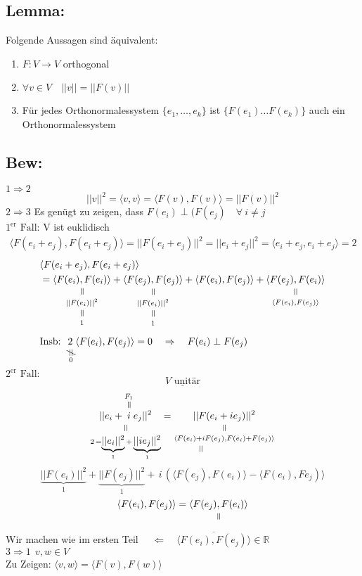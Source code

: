 \documentclass[titlepage,12pt,a4paper,ngerman]{report}
\newcommand{\verteq}{\rotatebox{90}{$\,=$}}
\newcommand{\equalto}[2]{\underset{\scriptstyle\overset{\mkern4mu\verteq}{#2}}{#1}}
\newcommand{\equaltoup}[2]{\overset{\scriptstyle\underset{\mkern4mu\verteq}{#2}}{#1}}
\newcommand{\custo}[3]{\underset{\scriptstyle\overset{\mkern4mu\rotatebox{-90}{$\,#1$}}{#3}}{#2}}
\newcommand{\tx}[1]{\textrm{#1}}
\newcommand{\basis}[3]{\{#1_{#2}, \dots, #1_{#3}\}}
\newcommand{\ska}[2]{\langle #1 , #2 \rangle}
\begin{document}
\subsection{Lemma:}
Folgende Aussagen sind äquivalent: 
\begin{enumerate}[1.)]
	\item $F:V \to V $ orthogonal
	\item $\forall v \in V \quad ||v|| = ||F(v)||$
	\item Für jedes Orthonormalessystem $\basis{e}{1}{k}$ ist $\{F(e_1) \dots F(e_k)\}$ auch ein Orthonormalessystem
\end{enumerate}

\subsection{Bew:}
$ \boxed{1 \Rightarrow 2} $ 
$$ ||v||^2 = \ska{v}{v} = \ska{F(v)}{F(v)} = ||F(v)||^2$$
$ \boxed{2 \Rightarrow 3} $ Es genügt zu zeigen, dass $ F(e_i) \perp (F(e_j) \quad \forall\ i \neq j $\\
$ \boxed{1^{\tx{er}}\tx{ Fall:}} $ V ist euklidisch
\begin{align*}
\ska{F(e_i + e_j)}{F(e_i + e_j)} = || F(e_i + e_j) ||^2 = ||e_i + e_j ||^2 = \ska{e_i + e_j}{e_i + e_j} = 2
\end{align*}
\begin{align*}
&\ska{F(e_i + e_j)}{F(e_i + e_j)}\\
&= \equalto{\ska{F(e_i)}{F(e_i)}}{\equalto{||F(e_i)||^2}{1}} + \equalto{\ska{F(e_j)}{F(e_j)}}{\equalto{||F(e_i)||^2}{1}} + \ska{F(e_i)}{F(e_j)} + \equalto{\ska{F(e_j)}{F(e_i)}}{\ska{F(e_i)}{F(e_j)}}\\[5pt]
&\tx{Insb: } \custo{\neq}{2}{\, 0} \ska{F(e_i)}{F(e_j)} = 0 \quad \Rightarrow \quad F(e_i) \perp F(e_j) 
\end{align*}
$\boxed{2^{\tx{er}} \tx{ Fall:}}$
$$\underline{V \tx{ unitär}}$$
$$\equalto{||e_i + \equaltoup{i}{F_1} e_j ||^2}{2\,  = \underbrace{||e_i||^2}_{1} + \underbrace{||ie_j||^2}_{1}} = \equalto{||F(e_i + ie_j)||^2}{\ska{\equalto{F(e_i) + i F(e_j)}{}}{F(e_i) + F(e_j)}}$$
$$\underbrace{||F(e_i)||^2}_{1} + \underbrace{||F(e_j)||^2}_{1} +\,  i\,  (\ska{F(e_j)}{F(e_i)}-\ska{F(e_i)}{Fe_j)}$$
$$\ska{F(e_i)}{F(e_j)} = \equalto{\ska{F(e_j)}{F(e_i)}}{}$$
Wir machen wie im ersten Teil $\quad \Leftarrow \quad \overline{\ska{F(e_i)}{F(e_j)}} \in \mathbb R$\\[10pt]
$ \boxed{3 \Rightarrow 1}  \ \ v,w \in V$\\
Zu Zeigen: $ \ska{v}{w} = \ska{F(v)}{F(w)} $\\
\end{document}
